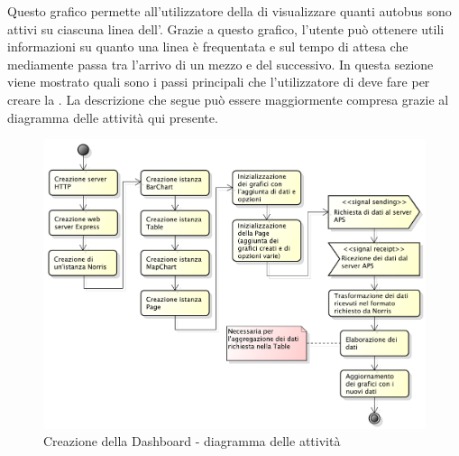     		Questo grafico permette all'utilizzatore della  di visualizzare quanti autobus sono attivi su ciascuna linea dell'. Grazie a questo grafico, l'utente può ottenere utili informazioni su quanto una linea è frequentata e sul tempo di attesa che mediamente passa tra l'arrivo di un mezzo e del successivo.
        In questa sezione viene mostrato quali sono i passi principali che l'utilizzatore di  deve fare per creare la  . La descrizione che segue può essere maggiormente compresa grazie al diagramma delle attività qui presente.
        \begin{figure}[H]\centering
            \includegraphics[width=\textwidth]{SpecificaTecnica/Pics/CreateDashboard.pdf}
            \caption{Creazione della Dashboard - diagramma delle attività}
        \end{figure}
